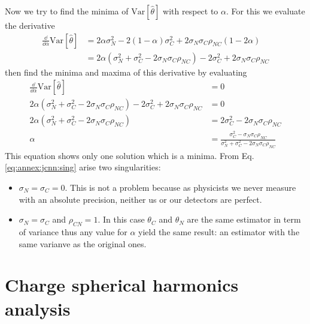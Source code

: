 \documentclass[../main.tex]{subfiles}
\begin{document}
Now we try to find the minima of $\mathrm{Var}[\hat{\theta}]$ with respect to $\alpha$. For this we evaluate the derivative
\begin{align}
  \frac{\dd}{\dd \alpha} \mathrm{Var}[\hat{\theta}] &= 2\alpha \sigma_N^2 - 2(1-\alpha) \sigma_C^2 + 2 \sigma_N \sigma_C \rho_{NC} (1- 2\alpha) \\
                                                    &= 2\alpha (\sigma_N^2 + \sigma_C^2 - 2 \sigma_N \sigma_C \rho_{NC}) - 2\sigma_C^2 + 2 \sigma_N \sigma_C \rho_{NC}
\end{align}
then find the minima and maxima of this derivative by evaluating
\begin{align}
  \frac{\dd}{\dd \alpha} \mathrm{Var}[\hat{\theta}] &= 0 \\
  2\alpha (\sigma_N^2 + \sigma_C^2 - 2 \sigma_N \sigma_C \rho_{NC}) - 2\sigma_C^2 + 2 \sigma_N \sigma_C \rho_{NC} & = 0 \\
  2\alpha (\sigma_N^2 + \sigma_C^2 - 2 \sigma_N \sigma_C \rho_{NC}) &= 2\sigma_C^2 - 2 \sigma_N \sigma_C \rho_{NC} \\
  \alpha & = \frac{\sigma_C^2 -  \sigma_N \sigma_C \rho_{NC}}{\sigma_N^2 + \sigma_C^2 - 2 \sigma_N \sigma_C \rho_{NC}} \label{eq:annex:jcnn:sing}
\end{align}
This equation shows only one solution which is a minima. From Eq. \ref{eq:annex:jcnn:sing} arise two singularities:
\begin{itemize}
  \item $\sigma_N = \sigma_C = 0$. This is not a problem because as physicists we never measure with an absolute precision, neither us or our detectors are perfect.
  \item $\sigma_N = \sigma_C$ and $\rho_{CN} = 1$. In this case $\theta_C$ and $\theta_N$ are the same estimator in term of variance thus any value for $\alpha$ yield the same result: an estimator with the same varianve as the original ones.
\end{itemize}

\chapter{Charge spherical harmonics analysis}
\label{sec:annex:jgnn:harms}
\end{document}
